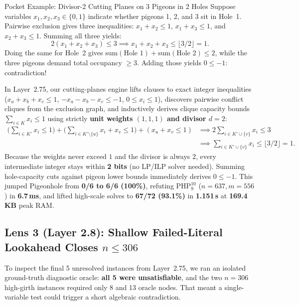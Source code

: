 \documentclass[11pt]{article}
\begin{document}
\begin{intuition}{Pocket Example: Divisor-2 Cutting Planes on 3 Pigeons in 2 Holes}
Suppose variables $x_1, x_2, x_3 \in \{0, 1\}$ indicate whether pigeons 1, 2, and 3 sit in Hole~1. Pairwise exclusion gives three inequalities: $x_1 + x_2 \le 1$, $x_1 + x_3 \le 1$, and $x_2 + x_3 \le 1$. Summing all three yields:
\[
2(x_1 + x_2 + x_3) \le 3 \implies x_1 + x_2 + x_3 \le \lfloor 3/2 \rfloor = 1.
\]
Doing the same for Hole~2 gives $\text{sum}(\text{Hole 1}) + \text{sum}(\text{Hole 2}) \le 2$, while the three pigeons demand total occupancy $\ge 3$. Adding those yields $0 \le -1$: contradiction!
\end{intuition}

In Layer~2.75, our cutting-planes engine lifts clauses to exact integer inequalities ($x_a + x_b + x_c \le 1$, $-x_a - x_b - x_c \le -1$, $0 \le x_i \le 1$), discovers pairwise conflict cliques from the exclusion graph, and inductively derives clique capacity bounds $\sum_{i \in K} x_i \le 1$ using strictly \textbf{unit weights $(1, 1, 1)$ and divisor $d = 2$}:
\begin{align*}
\Big(\sum_{i \in K'} x_i \le 1\Big) + \Big(\sum_{i \in K' \setminus \{u\}} x_i + x_v \le 1\Big) + (x_u + x_v \le 1)
&\implies 2 \sum_{i \in K' \cup \{v\}} x_i \le 3 \\
&\implies \sum_{i \in K' \cup \{v\}} x_i \le \lfloor 3/2 \rfloor = 1.
\end{align*}
Because the weights never exceed $1$ and the divisor is always $2$, every intermediate integer stays within \textbf{2 bits} (no LP/ILP solver needed). Summing hole-capacity cuts against pigeon lower bounds immediately derives $0 \le -1$. This jumped Pigeonhole from \textbf{0/6 to 6/6 (100\%)}, refuting $\mathrm{PHP}_9^{10}$ ($n = 637, m = 556$) in \textbf{6.7\,ms}, and lifted high-scale solves to \textbf{67/72 (93.1\%)} in \textbf{1.151\,s} at \textbf{169.4\,KB} peak RAM.

\subsection{Lens 3 (Layer 2.8): Shallow Failed-Literal Lookahead Closes \texorpdfstring{$n \le 306$}{n <= 306}}

To inspect the final 5 unresolved instances from Layer~2.75, we ran an isolated ground-truth diagnostic oracle: \textbf{all 5 were unsatisfiable}, and the two $n = 306$ high-girth instances required only 8 and 13 oracle nodes. That meant a single-variable test could trigger a short algebraic contradiction.
\end{document}
